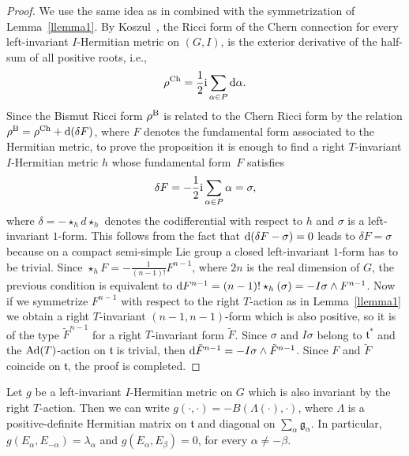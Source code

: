 \documentclass[10pt,a4paper]{amsart}
\numberwithin{equation}{section}
\begin{document}
\begin{proof}
We use the same idea as in \cite{FG} combined with the symmetrization of Lemma~\ref{llemma1}.
By Koszul~\cite{K},
the Ricci form of the Chern connection for every left-invariant $I$-Hermitian metric on $(G, I)$, is the exterior derivative of the half-sum of all positive roots, i.e.,
\[
\rho^{\rm Ch}= \frac{1}{2} {\rm i} \sum_{\alpha \in P} {\rm d} \alpha.
\]
Since the Bismut Ricci form $\rho^{\rm B}$ is related to the Chern Ricci form by the relation $\rho^{\rm B} = \rho^{\rm Ch} + {\rm d} (\delta F)$, where $F$ denotes the fundamental form associated to the Hermitian metric, to prove the proposition it is enough to find a right $T$-invariant $I$-Hermitian metric $h$ whose fundamental form~$F$ satisfies
\[
\delta F = - \frac{1}{2} {\rm i} \sum_{\alpha \in P} \alpha = \sigma,
\]
where $\delta = - \star_h d \star_h$ denotes the codifferential with respect to $h$ and $\sigma$ is a left-invariant $1$-form. This follows from the fact that ${\rm d} (\delta F - \sigma)=0$ leads to $\delta F = \sigma$ because on a compact semi-simple Lie group a closed left-invariant $1$-form has to be trivial.
Since $ \star_h F = - \frac{1}{(n -1)!} F^{n-1}$, where $2n$ is the real dimension of $G$, the previous condition is equivalent to ${\rm d} F^{n-1} = (n -1)! \star_h (\sigma) =- I\sigma\wedge F^{n-1}$.
Now if we symmetrize $F^{n-1}$
with respect to the right $T$-action as in Lemma~\ref{llemma1} we obtain a right $T$-invariant $(n-1,n-1)$-form which is also positive, so it is of the type $\tilde{F}^{n-1}$ for a right $T$-invariant form $\tilde{F}$. Since $\sigma$ and $I \sigma$ belong to $\mathfrak t^*$ and the ${\rm Ad}(T)$-action on $\mathfrak t$ is trivial, then ${\rm d} \tilde{F}^{n-1} = -I\sigma \wedge \tilde{F}^{n-1}$.
Since $F$ and $\tilde{F}$ coincide on $\mathfrak t$, the proof is completed.
\end{proof}

Let $g$ be a left-invariant $I$-Hermitian metric on $G$ which is also invariant by the right $T$-action. Then we can write $g (\cdot, \cdot ) = -B (\Lambda (\cdot), \cdot)$, where
$\Lambda$ is a positive-definite Hermitian matrix on $\mathfrak t$ and diagonal on $\sum_{\alpha} \mathfrak g_{\alpha}$.
In particular, $g (E_{\alpha}, E_{-\alpha}) = \lambda_{\alpha}$ and $g(E_{\alpha},E_{\beta}) =0$, for every $\alpha \neq - \beta$.
\end{document}
